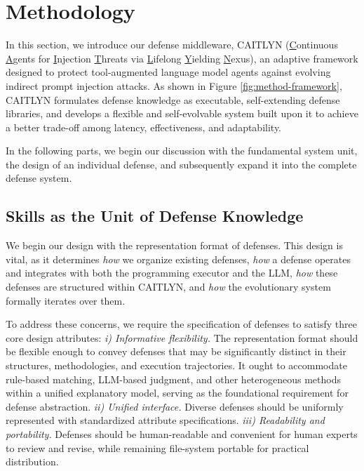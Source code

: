 \section{Methodology}
\label{sec:methodology}

In this section, we introduce our defense middleware, CAITLYN 
(\underline{C}ontinuous \underline{A}gents for \underline{I}njection
\underline{T}hreats via \underline{L}ifelong \underline{Y}ielding
\underline{N}exus), an adaptive framework designed to protect
tool-augmented language model agents against evolving indirect prompt
injection attacks. As shown in Figure \ref{fig:method-framework},
CAITLYN formulates defense knowledge as executable,
self-extending defense libraries, and develops a flexible and
self-evolvable system built upon it to achieve a better trade-off
among latency, effectiveness, and adaptability.

In the following parts, we begin our discussion with the fundamental
system unit, the design of an individual defense, and subsequently
expand it into the complete defense system.



\subsection{Skills as the Unit of Defense Knowledge}
\label{sec:representation}

We begin our design with the representation format of defenses. This
design is vital, as it determines \emph{how} we organize existing
defenses, \emph{how} a defense operates and integrates with both the
programming executor and the LLM, \emph{how} these defenses are
structured within CAITLYN, and \emph{how} the evolutionary system
formally iterates over them.

To address these concerns, we require the specification of defenses to
satisfy three core design attributes: \emph{i) Informative
  flexibility.} The representation format should be flexible enough to
convey defenses that may be significantly distinct in their
structures, methodologies, and execution trajectories. It ought to
accommodate rule-based matching, LLM-based judgment, and other
heterogeneous methods within a unified explanatory model, serving as
the foundational requirement for defense abstraction. \emph{ii)
  Unified interface.} Diverse defenses should be uniformly represented
with standardized attribute specifications. \emph{iii) Readability and
  portability.} Defenses should be human-readable and convenient for
human experts to review and revise, while remaining file-system
portable for practical distribution.

